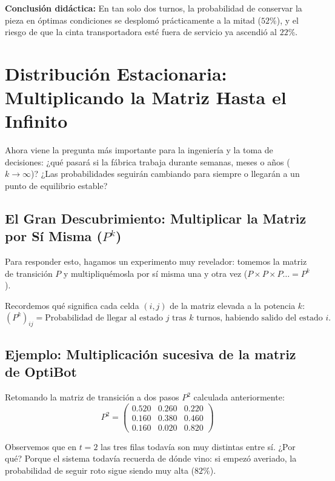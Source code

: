 \textbf{Conclusión didáctica:} En tan solo dos turnos, la probabilidad de conservar la pieza en óptimas condiciones se desplomó prácticamente a la mitad ($52\%$), y el riesgo de que la cinta transportadora esté fuera de servicio ya ascendió al $22\%$.

\section{Distribución Estacionaria: Multiplicando la Matriz Hasta el Infinito}
Ahora viene la pregunta más importante para la ingeniería y la toma de decisiones: ¿qué pasará si la fábrica trabaja durante semanas, meses o años ($k \to \infty$)? ¿Las probabilidades seguirán cambiando para siempre o llegarán a un punto de equilibrio estable?

\subsection{El Gran Descubrimiento: Multiplicar la Matriz por Sí Misma (\texorpdfstring{$P^k$}{Pk})}
Para responder esto, hagamos un experimento muy revelador: tomemos la matriz de transición $P$ y multipliquémosla por sí misma una y otra vez ($P \times P \times P \dots = P^k$).

Recordemos qué significa cada celda $(i, j)$ de la matriz elevada a la potencia $k$:
\begin{equation}
  \left(P^k\right)_{ij} = \text{Probabilidad de llegar al estado } j \text{ tras } k \text{ turnos, habiendo salido del estado } i.
\end{equation}

\subsection*{Ejemplo: Multiplicación sucesiva de la matriz de OptiBot}
Retomando la matriz de transición a dos pasos $P^2$ calculada anteriormente:
\begin{equation*}
  P^2 = 
  \begin{pmatrix}
    0.520 & 0.260 & 0.220 \\
    0.160 & 0.380 & 0.460 \\
    0.160 & 0.020 & 0.820
  \end{pmatrix}
\end{equation*}

Observemos que en $t=2$ las tres filas todavía son muy distintas entre sí. ¿Por qué? Porque el sistema todavía recuerda de dónde vino: si empezó averiado, la probabilidad de seguir roto sigue siendo muy alta ($82\%$).

